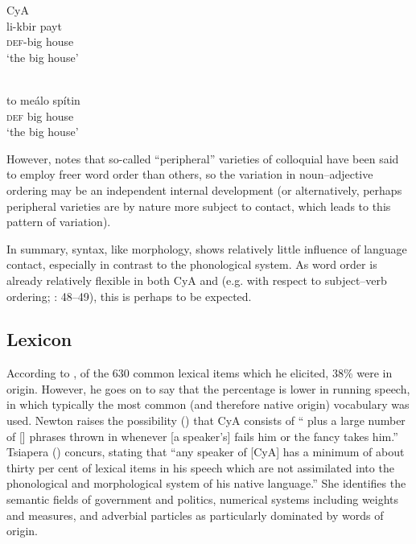 \documentclass[output=paper]{langsci/langscibook}
\begin{document}
\ex
{CyA}{} {\citealt[47]{Newton1964}}\\
\gll li-kbir payt\\
     \textsc{def}-big house  \\
\glt ‘the big house’

\ex
{}\\
\gll to meálo spítin\\
     \textsc{def} big house  \\
\glt ‘the big house’
\z
\z

However, \citet{Borg2004} notes that so-called “peripheral” varieties of colloquial  have been said to employ freer {word order} than others, so the variation in noun–adjective ordering may be an independent internal development (or alternatively, perhaps peripheral varieties are by nature more subject to contact, which leads to this pattern of variation).\largerpage


In summary, syntax, like morphology, shows relatively little influence of language contact, especially in contrast to the phonological system. As {word order} is already relatively flexible in both CyA and  (e.g. with respect to subject–verb ordering; \citealt{Newton1964}: 48–49), this is perhaps to be expected.

\subsection{Lexicon}

According to \citet{Newton1964}, of the 630 common lexical items which he elicited, 38\% were  in origin. However, he goes on to say that the percentage is lower in running speech, in which typically the most common (and therefore native  origin) vocabulary was used. Newton raises the possibility (\citeyear[51]{Newton1964}) that CyA consists of “ plus a large number of  [] phrases thrown in whenever [a speaker’s]  fails him or the fancy takes him.” Tsiapera (\citeyear[124]{Tsiapera1964}) concurs, stating that “any speaker of [CyA] has a minimum of about thirty per cent of  lexical items in his speech which are not assimilated into the phonological and morphological system of his native language.” She identifies the semantic fields of government and politics, numerical systems including weights and measures, and adverbial particles as particularly dominated by words of  origin.\largerpage
\end{document}
